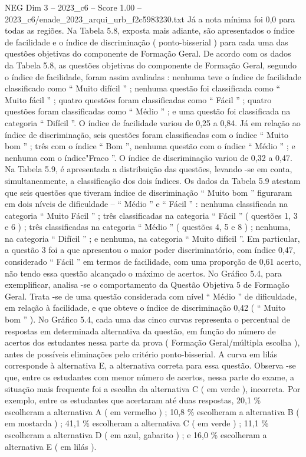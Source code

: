 \begin{textsample}{NEG Dim 3 – 2023\_c6 – Score 1.00 – 2023\_c6/enade\_2023\_arqui\_urb\_f2c5983230.txt}
Já a nota mínima foi 0,0 para todas as regiões.
Na Tabela 5.8, exposta mais adiante, são apresentados o índice de facilidade e o índice de discriminação ( ponto-bisserial ) para cada uma das questões objetivas do componente de Formação Geral.
De acordo com os dados da Tabela 5.8, as questões objetivas do componente de Formação Geral, segundo o índice de facilidade, foram assim avaliadas : nenhuma teve o índice de facilidade classificado como “ Muito difícil ” ; nenhuma questão foi classificada como “ Muito fácil ” ; quatro questões foram classificadas como “ Fácil ” ; quatro questões foram classificadas como “ Médio ” ; e uma questão foi classificada na categoria “ Difícil ”.
O índice de facilidade variou de 0,25 a 0,84.
Já em relação ao índice de discriminação, seis questões foram classificadas com o índice “ Muito bom ” ; três com o índice “ Bom ”, nenhuma questão com o índice “ Médio ” ; e nenhuma com o índice"Fraco ”.
O índice de discriminação variou de 0,32 a 0,47.
Na Tabela 5.9, é apresentada a distribuição das questões, levando -se em conta, simultaneamente, a classificação dos dois índices.
Os dados da Tabela 5.9 atestam que seis questões que tiveram índice de discriminação “ Muito bom ” figuraram em dois níveis de dificuldade – “ Médio ” e “ Fácil ” : nenhuma classificada na categoria “ Muito Fácil ” ; três classificadas na categoria “ Fácil ” ( questões 1, 3 e 6 ) ; três classificadas na categoria “ Médio ” ( questões 4, 5 e 8 ) ; nenhuma, na categoria “ Difícil ” ; e nenhuma, na categoria “ Muito difícil ”.
Em particular, a questão 3 foi a que apresentou o maior poder discriminatório, com índice 0,47, considerado “ Fácil ” em termos de facilidade, com uma proporção de 0,61 acerto, não tendo essa questão alcançado o máximo de acertos.
No Gráfico 5.4, para exemplificar, analisa -se o comportamento da Questão Objetiva 5 de Formação Geral.
Trata -se de uma questão considerada com nível “ Médio ” de dificuldade, em relação à facilidade, e que obteve o índice de discriminação 0,42 ( “ Muito bom ” ).
No Gráfico 5.4, cada uma das cinco curvas representa o percentual de respostas em determinada alternativa da questão, em função do número de acertos dos estudantes nessa parte da prova ( Formação Geral/múltipla escolha ), antes de possíveis eliminações pelo critério ponto-bisserial.
A curva em lilás corresponde à alternativa E, a alternativa correta para essa questão.
Observa -se que, entre os estudantes com menor número de acertos, nessa parte do exame, a situação mais frequente foi a escolha da alternativa C ( em verde ), incorreta.
Por exemplo, entre os estudantes que acertaram até duas respostas, 20,1 \% escolheram a alternativa A ( em vermelho ) ; 10,8 \% escolheram a alternativa B ( em mostarda ) ; 41,1 \% escolheram a alternativa C ( em verde ) ; 11,1 \% escolheram a alternativa D ( em azul, gabarito ) ; e 16,0 \% escolheram a alternativa E ( em lilás ).

\end{textsample}
